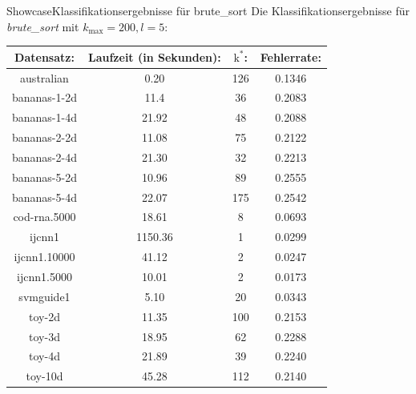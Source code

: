 \documentclass[9pt]{beamer}
\begin{document}
\begin{frame}{Showcase}{Klassifikationsergebnisse für brute\_sort}
Die Klassifikationsergebnisse für \textit{brute\_sort} mit $k_\text{max} = 200, l = 5$:
\begin{center}
\begin{tabular}{|c|c|c|c|}
\hline
\textbf{Datensatz:}& \textbf{Laufzeit (in Sekunden):} & \textbf{$\text{k}^*$:} & \textbf{Fehlerrate:}\\

\hline

australian & 0.20 & 126 & 0.1346\\

\hline

bananas-1-2d  &11.4 &36 &0.2083\\

\hline

bananas-1-4d  &21.92 &48 &0.2088\\

\hline

bananas-2-2d  &11.08 &75 &0.2122\\

\hline

bananas-2-4d  &21.30 &32 &0.2213\\

\hline

bananas-5-2d  &10.96 &89 &0.2555\\

\hline

bananas-5-4d  &22.07 &175 &0.2542\\

\hline

 cod-rna.5000 &18.61 &8 &0.0693\\

\hline

 ijcnn1 &1150.36 &1 &0.0299\\

\hline

ijcnn1.10000  &41.12 &2 &0.0247\\

\hline

ijcnn1.5000  &10.01 &2 &0.0173\\

\hline

svmguide1  &5.10 &20 &0.0343\\

\hline



toy-2d  &11.35 &100 &0.2153\\

\hline

 toy-3d &18.95 &62 &0.2288\\

\hline

toy-4d  &21.89 &39 &0.2240\\

\hline

toy-10d  &45.28 &112 &0.2140\\

\hline


\end{tabular}
\end{center}
\end{frame}
\end{document}
